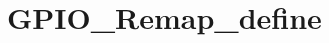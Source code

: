 \hypertarget{group___g_p_i_o___remap__define}{\section{G\-P\-I\-O\-\_\-\-Remap\-\_\-define}
\label{group___g_p_i_o___remap__define}
}
